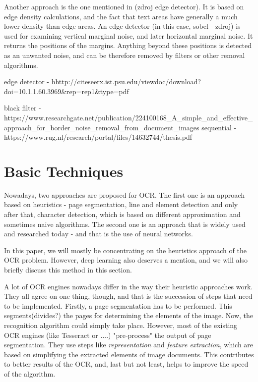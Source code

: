Another approach is the one mentioned in (zdroj edge detector). It is based on edge density calculations, and the fact that text areas have generally a much lower density than edge areas. An edge detector (in this case, sobel - zdroj) is used for examining vertical marginal noise, and later horizontal marginal noise. It returns the positions of the margins. Anything beyond these positions is detected as an unwanted noise, and can be therefore removed by filters or other removal algorithms.

edge detector - hhttp://citeseerx.ist.psu.edu/viewdoc/download?doi=10.1.1.60.3969&rep=rep1&type=pdf

black filter -  https://www.researchgate.net/publication/224100168_A_simple_and_effective_approach_for_border_noise_removal_from_document_images
sequential - https://www.rug.nl/research/portal/files/14632744/thesis.pdf

\section{Basic Techniques}

Nowadays, two approaches are proposed for OCR. The first one is an approach based on heuristics - page segmentation, line and element detection and only after that, character detection, which is based on different approximation and sometimes naive algorithms. The second one is an approach that is widely used and researched today - and that is the use of neural networks.

In this paper, we will mostly be concentrating on the heuristics approach of the OCR problem. However, deep learning also deserves a mention, and we will also briefly discuss this method in this section.

A lot of OCR engines nowadays differ in the way their heuristic approaches work. They all agree on one thing, though, and that is the succession of steps that need to be implemented. Firstly, a page segmentation has to be performed. This segments(divides?) the pages for determining the elements of the image. Now, the recognition algorithm could simply take place. However, most of the existing OCR engines (like Tesseract or ....) "pre-process" the output of page segmentation. They use steps like \emph{representation} and \emph{feature extraction}, which are based on simplifying the extracted elements of image documents. This contributes to better results of the OCR, and, last but not least, helps to improve the speed of the algorithm.

